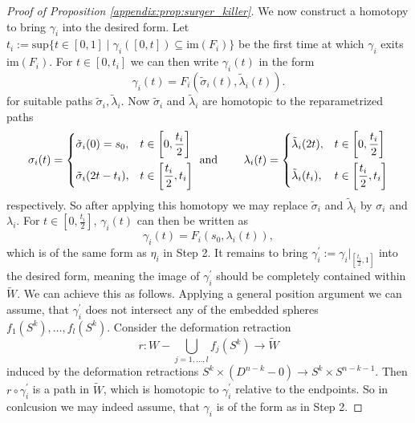 \begin{proof}[Proof of Proposition \ref{appendix:prop:surger_killer}]
    We now construct a homotopy to bring $\gamma_i$ into the desired form. Let $t_i := \mathrm{sup}\{t \in [0,1] \mid \gamma_i([0,t]) \subseteq \mathrm{im}(F_i)\}$ be the first time at which $\gamma_i$ exits $\mathrm{im}(F_i)$. For $t \in [0,t_i]$ we can then write $\gamma_i(t)$ in the form 
    \[
    \gamma_i(t) = F_i(\tilde{\sigma}_i(t), \tilde{\lambda}_i(t)).
    \]
    for suitable paths $\tilde{\sigma}_i, \tilde{\lambda}_i$. Now $\tilde{\sigma}_i$ and $\tilde{\lambda}_i$ are homotopic to the reparametrized paths 
    \[
    \begin{aligned}
    \sigma_i(t) = \begin{dcases}
    \tilde{\sigma}_i(0) = s_0, & t \in \left[0,\frac{t_i}{2}\right] \\
    \tilde{\sigma}_i(2t-t_i), & t \in \left[\frac{t_i}{2},t_i\right]
    \end{dcases} \text{ and }
    \qquad
    \lambda_i(t) = \begin{dcases}
    \tilde{\lambda}_i(2t), & t \in \left[0,\frac{t_i}{2}\right] \\
    \tilde{\lambda}_i(t_i), & t \in \left[\frac{t_i}{2},t_i\right]
    \end{dcases}
    \end{aligned}
    \]
    respectively. So after applying this homotopy we may replace $\tilde{\sigma}_i$ and $\tilde{\lambda}_i$ by $\sigma_i$ and $\lambda_i$. For $t \in  \left[0,\frac{t_i}{2}\right]$, $\gamma_i(t)$ can then be written as 
    \[
    \gamma_i(t) = F_i(s_0,\lambda_i(t)),
    \]
    which is of the same form as $\eta_i$ in Step 2. It remains to bring $\gamma^\prime_i := \gamma_i|_{\left[\frac{t_i}{2},1\right]}$ into the desired form, meaning the image of $\gamma_i^\prime$ should be completely contained within $\tilde{W}$. We can achieve this as follows. Applying a general position argument we can assume, that $\gamma_i^\prime$ does not intersect any of the embedded spheres $f_1(S^k), \ldots, f_l(S^k)$. Consider the deformation retraction
    \[
    r \colon W - \bigcup_{j=1,\ldots,l} f_j(S^k) \to \tilde{W}
    \]
    induced by the deformation retractions $S^k \times (D^{n-k} - 0) \to S^k \times S^{n-k-1}$. Then $r \circ \gamma_i^\prime$ is a path in $\tilde{W}$, which is homotopic to $\gamma_i^\prime$ relative to the endpoints. So in conlcusion we may indeed assume, that $\gamma_i$ is of the form as in Step 2.

    \vspace{.5em}


\end{proof}
